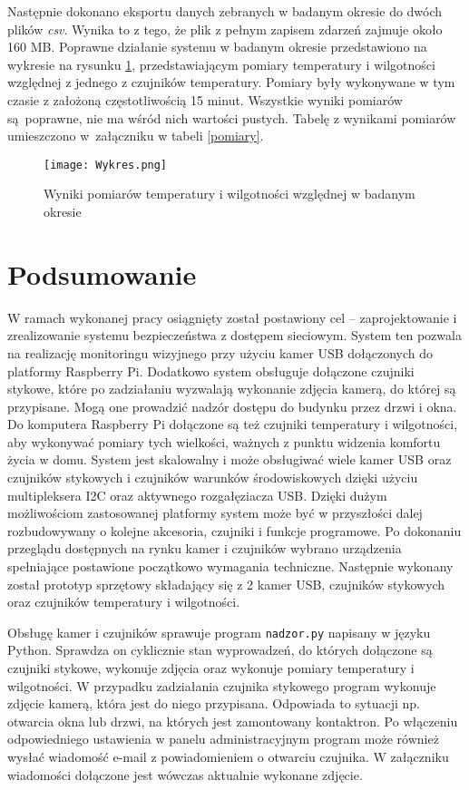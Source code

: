 \documentclass[a4paper,11pt,twoside]{article}
\begin{document}
Następnie dokonano eksportu danych zebranych w badanym okresie do dwóch plików \textit{csv}. Wynika to z tego, że plik z pełnym zapisem zdarzeń zajmuje około 160 MB. Poprawne działanie systemu w badanym okresie przedstawiono na wykresie na rysunku \ref{fig: test_pomiary}, przedstawiającym pomiary temperatury i wilgotności względnej z jednego z czujników temperatury. Pomiary były wykonywane w tym czasie z założoną częstotliwością 15 minut. Wszystkie wyniki pomiarów są~poprawne, nie ma wśród nich wartości pustych. Tabelę z wynikami pomiarów umieszczono w~załączniku w tabeli \ref{pomiary}.

\begin{figure}[H]
\begin{center}
\texttt{[image: Wykres.png]}
\caption{Wyniki pomiarów temperatury i wilgotności względnej w badanym okresie}
\label{fig: test_pomiary}
\end{center}
\end{figure}


\newpage
\section{Podsumowanie}
W ramach wykonanej pracy osiągnięty został postawiony cel -- zaprojektowanie i zrealizowanie systemu bezpieczeństwa z dostępem sieciowym. System ten pozwala na realizację monitoringu wizyjnego przy użyciu kamer USB dołączonych do platformy Raspberry Pi. Dodatkowo system obsługuje dołączone czujniki stykowe, które po zadziałaniu wyzwalają wykonanie zdjęcia kamerą, do której są przypisane. Mogą one prowadzić nadzór dostępu do budynku przez drzwi i okna. Do komputera Raspberry Pi dołączone są też czujniki temperatury i wilgotności, aby wykonywać pomiary tych wielkości, ważnych z punktu widzenia komfortu życia w domu. System jest skalowalny i może obsługiwać wiele kamer USB oraz czujników stykowych i czujników warunków środowiskowych dzięki użyciu multipleksera I2C oraz aktywnego rozgałęziacza USB. Dzięki dużym możliwościom zastosowanej platformy system może być w przyszłości dalej rozbudowywany o kolejne akcesoria, czujniki i funkcje programowe. Po dokonaniu przeglądu dostępnych na rynku kamer i czujników wybrano urządzenia spełniające postawione początkowo wymagania techniczne. Następnie wykonany został prototyp sprzętowy składający się z 2 kamer USB, czujników stykowych oraz czujników temperatury i wilgotności.

Obsługę kamer i czujników sprawuje program \texttt{nadzor.py} napisany w języku Python. Sprawdza on cyklicznie stan wyprowadzeń, do których dołączone są czujniki stykowe, wykonuje zdjęcia oraz wykonuje pomiary temperatury i wilgotności. W przypadku zadziałania czujnika stykowego program wykonuje zdjęcie kamerą, która jest do niego przypisana. Odpowiada to sytuacji np. otwarcia okna lub drzwi, na których jest zamontowany kontaktron. Po włączeniu odpowiedniego ustawienia w panelu administracyjnym program może również wysłać wiadomość e-mail z powiadomieniem o otwarciu czujnika. W załączniku wiadomości dołączone jest wówczas aktualnie wykonane zdjęcie.
\end{document}

